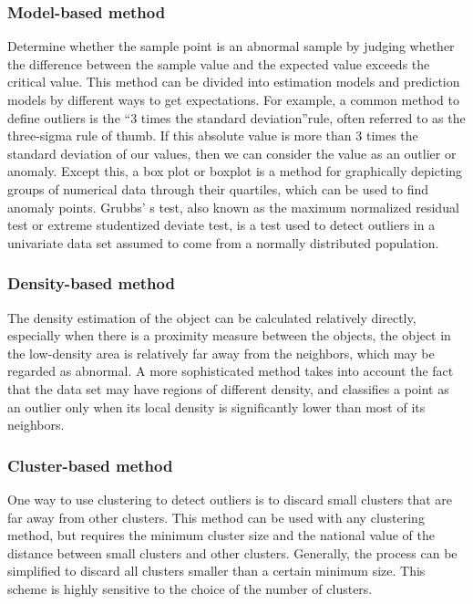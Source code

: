 \subsubsection{Model-based method}
Determine whether the sample point is an abnormal sample by judging whether the difference between the sample value and the expected value exceeds the critical value. This method can be divided into estimation models and prediction models by different ways to get expectations. For example, a common method to define outliers is the “3 times the standard deviation”rule, often referred to as the three-sigma rule of thumb. If this absolute value is more than 3 times the standard deviation of our values, then we can consider the value as an outlier or anomaly. Except this, a box plot or boxplot is a method for graphically depicting groups of numerical data through their quartiles, which can be used to find anomaly points. Grubbs' s test, also known as the maximum normalized residual test or extreme studentized deviate test, is a test used to detect outliers in a univariate data set assumed to come from a normally distributed population.

\subsubsection{Density-based method}
The density estimation of the object can be calculated relatively directly, especially when there is a proximity measure between the objects, the object in the low-density area is relatively far away from the neighbors, which may be regarded as abnormal. A more sophisticated method takes into account the fact that the data set may have regions of different density, and classifies a point as an outlier only when its local density is significantly lower than most of its neighbors.

\subsubsection{Cluster-based method}
One way to use clustering to detect outliers is to discard small clusters that are far away from other clusters. This method can be used with any clustering method, but requires the minimum cluster size and the national value of the distance between small clusters and other clusters. Generally, the process can be simplified to discard all clusters smaller than a certain minimum size. This scheme is highly sensitive to the choice of the number of clusters.

